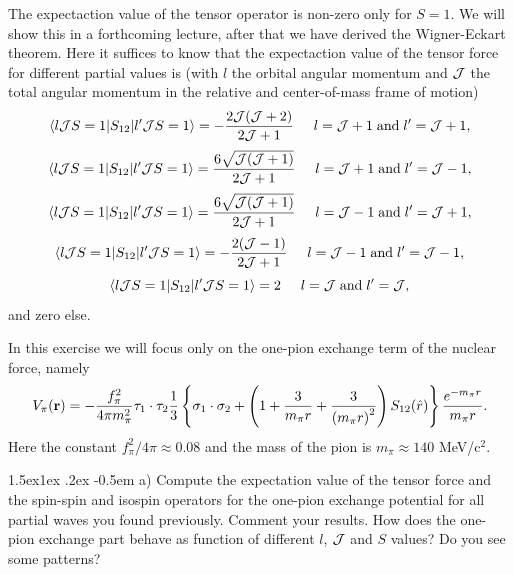 \documentclass[%
oneside,                 %
final,                   %
10pt]{article}
\makeatletter
\newenvironment{doconceexercise}{}{}
\newcommand\subex{\@startsection{paragraph}{4}{\z@}%
                  {1.5ex\@plus1ex \@minus.2ex}%
                  {-0.5em}%
                  {\normalfont\normalsize\bfseries}}
\makeatother
\begin{document}
\begin{doconceexercise}
The expectaction value of the tensor operator is non-zero only for $S=1$. We will show this in a forthcoming lecture, after that we have derived the Wigner-Eckart theorem. 
Here it suffices to know that the expectaction value of the tensor force for different partial values is  (with $l$ the orbital angular momentum and ${\cal J}$ the total angular momentum in the relative and center-of-mass frame of motion)
\[
\langle l {\cal J}S=1| S_{12} | l' {\cal J}S=1\rangle = -\frac{2{\cal J}({\cal J}+2)}{2{\cal J}+1} \hspace{0.5cm} l= {\cal J}+1 \hspace{0.1cm}\mathrm{and} \hspace{0.1cm} l'={\cal J}+1,
\]
\[
\langle l {\cal J}S=1| S_{12} | l' {\cal J}S=1\rangle = \frac{6\sqrt{{\cal J}({\cal J}+1)}}{2{\cal J}+1} \hspace{0.5cm} l= {\cal J}+1 \hspace{0.1cm}\mathrm{and} \hspace{0.1cm} l'={\cal J}-1,
\]
\[
\langle l {\cal J}S=1| S_{12} | l' {\cal J}S=1\rangle = \frac{6\sqrt{{\cal J}({\cal J}+1)}}{2{\cal J}+1} \hspace{0.5cm} l= {\cal J}-1 \hspace{0.1cm}\mathrm{and} \hspace{0.1cm} l'={\cal J}+1,
\]
\[
\langle l {\cal J}S=1| S_{12} | l' {\cal J}S=1\rangle = -\frac{2({\cal J}-1)}{2{\cal J}+1} \hspace{0.5cm} l= {\cal J}-1 \hspace{0.1cm}\mathrm{and} \hspace{0.1cm} l'={\cal J}-1,
\]
\[
\langle l {\cal J}S=1| S_{12} | l' {\cal J}S=1\rangle = 2 \hspace{0.5cm} l= {\cal J} \hspace{0.1cm}\mathrm{and} \hspace{0.1cm} l'={\cal J},
\]
and zero else.   

In this exercise we will focus only on the one-pion exchange term of the nuclear force, namely
\[
V_{\pi}(\mathbf{r})= -\frac{f_{\pi}^{2}}{4\pi m_{\pi}^{2}}\mathbf{ \tau}_1\cdot\mathbf{\tau}_2
\frac{1}{3}\left\{\mathbf{ \sigma}_1\cdot\mathbf{ \sigma}_2+\left( 1 + {3\over m_\pi r} + {3\over\left(m_\pi r\right)^2}\right) S_{12} (\hat r)\right\} \frac{e^{-m_\pi r}}{m_\pi r}.
\]
Here the constant $f_{\pi}^{2}/4\pi\approx 0.08$ and the mass of the pion is $m_\pi\approx 140$ MeV/c${}^{2}$.


\subex{a)}
Compute the expectation value of the tensor force and the spin-spin  and isospin operators for the one-pion exchange potential for all partial waves you found previously. Comment your results. How does the one-pion exchange part behave as function of different $l$, ${\cal J}$ and $S$ values? Do you see some patterns?


\end{doconceexercise}
\end{document}
